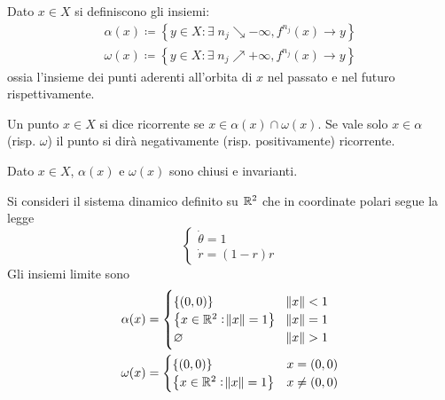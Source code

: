 \begin{definition}
    Dato $ x\in X $ si definiscono gli insiemi:
    \begin{align*}
        \alpha(x) \coloneqq \left\{ y\in X : \exists\; n_j \searrow -\infty, f^{n_j}(x) \to y \right\} \\
        \omega(x) \coloneqq \left\{ y\in X : \exists\; n_j \nearrow +\infty, f^{n_j}(x) \to y \right\}
    \end{align*}
    ossia l'insieme dei punti aderenti all'orbita di $ x $ nel passato e nel futuro rispettivamente.
\end{definition}

\begin{definition}
    Un punto $ x\in X $ si dice ricorrente se $ x\in \alpha(x) \cap \omega(x) $. Se vale solo $ x\in \alpha $ (risp. $ \omega $) il punto si dirà negativamente (risp. positivamente) ricorrente.
\end{definition}
\begin{exercise}
    Dato $ x\in X $, $ \alpha(x) $ e $ \omega(x) $ sono chiusi e invarianti.
\end{exercise}

\begin{example}
    Si consideri il sistema dinamico definito su $\mathbb{R}^2$ che in coordinate polari segue la legge
    \[
        \begin{cases}
            \dot{\theta}  = 1      \\
            \dot{r}       = (1-r)r
        \end{cases}
    \]
    Gli insiemi limite sono
    \begin{align*}
        \alpha(x) &=
        \begin{cases}
            \{ (0,0) \}                                & \norm{x} < 1 \\
            \left \{x \in \mathbb{R}^2: \norm{x} = 1 \right \} & \norm{x} = 1 \\
            \varnothing                                  & \norm{x} > 1
        \end{cases} \\
        \omega(x) &=
        \begin{cases}
            \{ (0,0) \} & x = (0,0) \\
            \left \{x \in \mathbb{R}^2: \norm{x} = 1 \right \} & x \neq (0,0)
        \end{cases}
    \end{align*}
\end{example}

